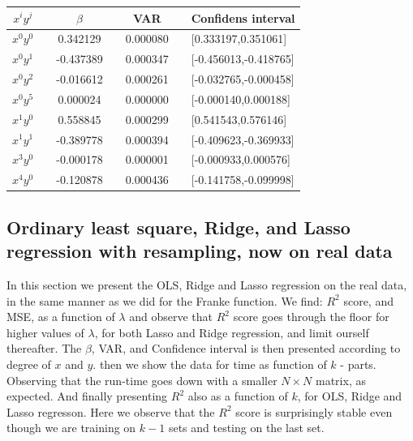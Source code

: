  \begin{center}
\label{tab:lasso-var-conf}
\begin{tabularx}{\textwidth}{c X c X c X l}
    \hline
    \hline
        $x^iy^j$ && $\beta$ && VAR && Confidens interval\\
    \hline
        $x^0y^0$ && 0.342129   && 0.000080   && [0.333197,0.351061] \\
        $x^0y^1$ && -0.437389  && 0.000347   && [-0.456013,-0.418765] \\
        $x^0y^2$ && -0.016612  && 0.000261   && [-0.032765,-0.000458] \\
        $x^0y^5$ && 0.000024   && 0.000000   && [-0.000140,0.000188] \\
        $x^1y^0$ && 0.558845   && 0.000299   && [0.541543,0.576146] \\
        $x^1y^1$ && -0.389778  && 0.000394   && [-0.409623,-0.369933] \\
        $x^3y^0$ && -0.000178  && 0.000001   && [-0.000933,0.000576] \\
        $x^4y^0$ && -0.120878  && 0.000436   && [-0.141758,-0.099998] \\
    \hline
\end{tabularx}
\end{center}


 \pagebreak
 
\subsection{Ordinary least square, Ridge, and Lasso regression with resampling, now on real data}
In this section we present the OLS, Ridge and Lasso regression on the real data, in the same manner as we did for the Franke function. We find: $R^2$ score, and MSE, as a function of $\lambda$ and observe that $R^2$ score goes through the floor for higher values of $\lambda$, for both Lasso and Ridge regression, and limit ourself thereafter. The $\beta$, VAR, and Confidence interval is then presented according to degree of $x$ and $y$. then we show the data for time as function of $k$ - parts. Observing that the run-time goes down with a smaller $N \times N$ matrix, as expected. And finally presenting $R^2$ also as a function of $k$, for OLS, Ridge and Lasso regresson.  Here we observe that the $R^2$ score is surprisingly stable even though we are training on $k-1$ sets and testing on the last set. 


